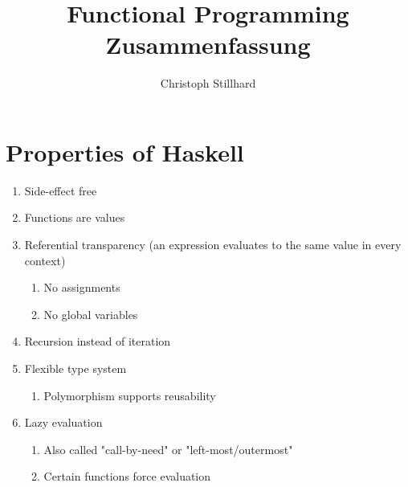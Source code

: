 \documentclass[10pt]{article}
\title{\textbf{Functional Programming Zusammenfassung}}
\author{Christoph Stillhard}
\date{}
\newcommand{\enumstart}{\begin{enumerate}}
\newcommand{\enumend}{\end{enumerate}}
\begin{document}
\maketitle
{}
\thispagestyle{empty}

\let\stdsection\section
\renewcommand\section{\newpage\stdsection}

\newpage
{}
\setcounter{page}{1}
\tableofcontents

\newpage
{}
\setcounter{page}{1}

\section{Properties of Haskell}
\enumstart
	\item Side-effect free
	\item Functions are values
	\item Referential transparency (an expression evaluates to the same value in every context)
	\enumstart
		\item No assignments
		\item No global variables
	\enumend
	\item Recursion instead of iteration
	\item Flexible type system
	\enumstart
		\item Polymorphism supports reusability
	\enumend
	\item Lazy evaluation
	\enumstart
		\item Also called "call-by-need" or "left-most/outermost"
		\item Certain functions force evaluation
	\enumend
\enumend
\end{document}
